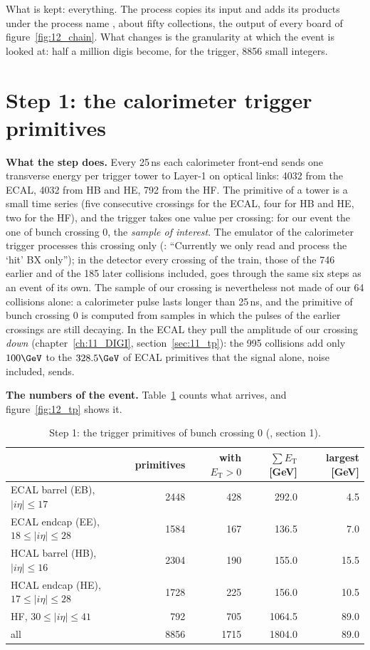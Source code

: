 What is kept: everything. The  process copies its input and adds its products under the process name
, about fifty collections, the output of every board of figure~\ref{fig:12_chain}. What changes is the
granularity at which the event is looked at: half a million digis become, for the trigger, 8856 small integers.

\section{Step 1: the calorimeter trigger primitives}

\textbf{What the step does.} Every 25\,ns each calorimeter front-end sends one transverse energy per trigger tower
to Layer-1 on optical links: 4032 from the ECAL, 4032 from HB and HE, 792 from the HF. The primitive of a tower is
a small time series (five consecutive crossings for the ECAL, four for HB and HE, two for the HF), and the trigger takes one value
per crossing: for our event the one of bunch crossing 0, the \emph{sample of interest}. The emulator of the
calorimeter trigger processes this crossing only (: ``Currently
we only read and process the `hit' BX only''); in the detector every crossing of the train, those of the 746 earlier
and of the 185 later collisions included, goes through the same six steps as an event of its own. The sample of our
crossing is nevertheless not made of our 64 collisions alone: a calorimeter pulse lasts longer than 25\,ns, and the
primitive of bunch crossing 0 is computed from samples in which the pulses of the earlier crossings are still
decaying. In the ECAL they pull the amplitude of our crossing \emph{down} (chapter~\ref{ch:11_DIGI},
section~\ref{sec:11_tp}): the 995 collisions add only $100\GeV$ to the $328.5\GeV$ of ECAL primitives that the signal
alone, noise included, sends.

\textbf{The numbers of the event.} Table~\ref{tab:12_tp} counts what arrives, and figure~\ref{fig:12_tp} shows it.

\begin{table}[!htb]
\centering\small
\caption{Step 1: the trigger primitives of bunch crossing 0 (, section 1).}
\label{tab:12_tp}
\begin{tabular}{l rrrr}
\toprule
 & primitives & with $E_{\mathrm T}>0$ & $\sum E_{\mathrm T}$ [GeV] & largest [GeV] \\
\midrule
ECAL barrel (EB), $|i\eta|\leq17$ & 2448 & 428 & 292.0 & 4.5 \\
ECAL endcap (EE), $18\leq|i\eta|\leq28$ & 1584 & 167 & 136.5 & 7.0 \\
HCAL barrel (HB), $|i\eta|\leq16$ & 2304 & 190 & 155.0 & 15.5 \\
HCAL endcap (HE), $17\leq|i\eta|\leq28$ & 1728 & 225 & 156.0 & 10.5 \\
HF, $30\leq|i\eta|\leq41$ & 792 & 705 & 1064.5 & 89.0 \\
\midrule
all & 8856 & 1715 & 1804.0 & 89.0 \\
\bottomrule
\end{tabular}
\end{table}

